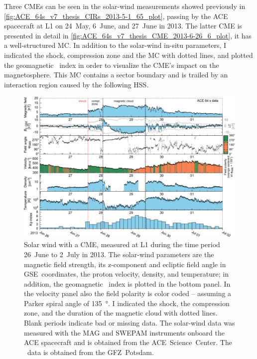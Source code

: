 Three CMEs can be seen in the solar-wind measurements showed previously in \autoref{fig:ACE_64s_v7_thesis_CIRs_2013-5-1_65_plot}, passing by the ACE spacecraft at L1 on 24~May, 6~June, and 27~June in 2013. The latter CME is presented in detail in \autoref{fig:ACE_64s_v7_thesis_CME_2013-6-26_6_plot}, it has a well-structured MC. In addition to the solar-wind in-situ parameters, I indicated the shock, compression zone and the MC with dotted lines, and plotted the geomagnetic \Kp{}~index in order to visualize the CME's impact on the magnetosphere. This MC contains a sector boundary and is trailed by an interaction region caused by the following HSS.\\
\begin{figure}[htb]
	\centering
	\includegraphics[width=\textwidth]{figures_of_mine/gnuplots/ACE_64s_v7_thesis_CME_2013-6-26_6_plot.pdf}
	\caption[]
	{Solar wind with a CME, measured at L1 during the time period 26~June to 2~July in 2013. The solar-wind parameters are the magnetic field strength, its z-component and ecliptic field angle in GSE~coordinates, the proton velocity, density, and temperature; in addition, the geomagnetic \Kp~index is plotted in the bottom panel. In the velocity panel also the field polarity is color coded -- assuming a Parker spiral angle of \SI{135}{\degree}. I indicated the shock, the compression zone, and the duration of the magnetic cloud with dotted lines. Blank periods indicate bad or missing data. The solar-wind data was measured with the MAG and SWEPAM instruments onboard the ACE spacecraft and is obtained from the ACE~Science~Center. The \Kp{}~data is obtained from the GFZ~Potsdam.}
	\label{fig:ACE_64s_v7_thesis_CME_2013-6-26_6_plot}
\end{figure}

